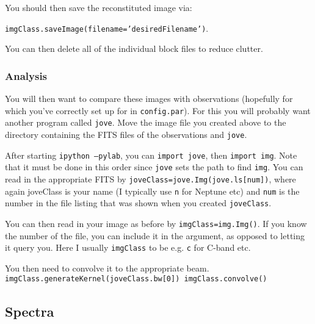 \documentclass[11pt]{article}
\begin{document}
You should then save the reconstituted image via: 

\texttt{imgClass.saveImage(filename='desiredFilename')}.

\noindent
You can then delete all of the individual block files to reduce clutter.

\subsubsection{Analysis}
You will then want to compare these images with observations (hopefully for which you've correctly set up for in \texttt{config.par}).  For this you will probably want another program called \texttt{jove}.  Move the image file you created above to the directory containing the FITS files of the observations and \texttt{jove}.

After starting \texttt{ipython --pylab}, you can \texttt{import jove}, then \texttt{import img}.  Note that it must be done in this order since \texttt{jove} sets the path to find \texttt{img}.   You can read in the appropriate FITS by \texttt{joveClass=jove.Img(jove.ls[num])}, where again joveClass is your name (I typically use \texttt{n} for Neptune etc) and \texttt{num} is the number in the file listing that was shown when you created \texttt{joveClass}.

You can then read in your image as before by \texttt{imgClass=img.Img()}.  If you know the number of the file, you can include it in the argument, as opposed to letting it query you.  Here I usually \texttt{imgClass} to be e.g. \texttt{c} for C-band etc.

You then need to convolve it to the appropriate beam.
\texttt{
imgClass.generateKernel(joveClass.bw[0])
imgClass.convolve()
}

\subsection{Spectra}




\end{document}
